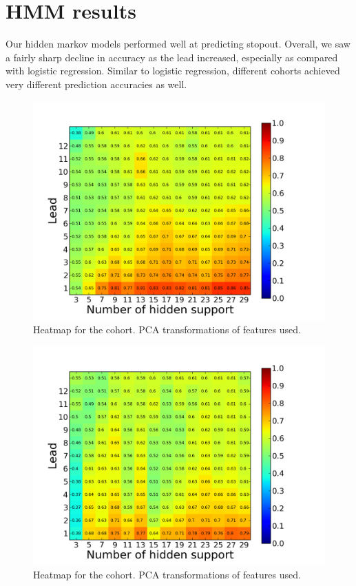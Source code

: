\section{HMM results}
Our hidden markov models performed well at predicting stopout.  Overall, we saw a fairly sharp decline in accuracy as the lead increased, especially as compared with logistic regression. Similar to logistic regression, different cohorts achieved very different prediction accuracies as well.

\begin{figure}[ht!]
  \caption{Heatmap for the \neither cohort. PCA transformations of features used.}\label{fig:hmm_heatmap_no_collab_pca}
  \centering
    \includegraphics[width=1.0\textwidth]{figures/hmm/no_collab_pca.png}
\end{figure}

\begin{figure}[ht!]
  \caption{Heatmap for the \forum cohort. PCA transformations of features used.}\label{fig:hmm_heatmap_forum_only_pca}
  \centering
    \includegraphics[width=1.0\textwidth]{figures/hmm/forum_only_pca.png}
\end{figure}

